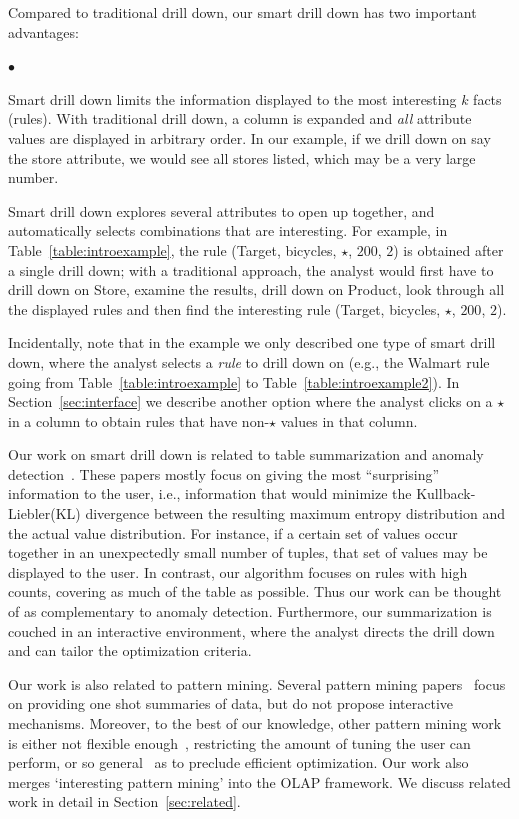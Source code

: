 \documentclass[10pt,journal,compsoc]{IEEEtran}
\newcommand{\squishlist}{
   \begin{list}{$\bullet$}
    { \setlength{\itemsep}{0pt}
      \setlength{\parsep}{2pt}
      \setlength{\topsep}{2pt}
      \setlength{\partopsep}{0pt}
    }
}
\newcommand{\squishend}{\end{list}}
\begin{document}
 Compared to traditional drill down, our smart drill down has two important advantages:
\squishlist
\item
Smart drill down limits the information displayed
to the most interesting $k$ facts (rules).
With traditional drill down, a column is expanded and {\em all}
attribute values are displayed in arbitrary order.
In our example, if we drill down on say the store attribute,
we would see all stores listed, which may be a very large number.
\item
Smart drill down explores several attributes to open up together,
and automatically selects combinations that are interesting.
For example, in Table~\ref{table:introexample},
the rule (Target, bicycles, $\star$, $200$, $2$)
is obtained after a single drill down;
with a traditional approach, the analyst would first have to drill down on
Store, examine the results, drill down on Product,
look through all the displayed rules and then find the interesting rule
(Target, bicycles, $\star$, $200$, $2$).
\squishend

Incidentally, note that in the example we only described one type of smart drill down,
where the analyst selects a {\em rule} to drill down on
(e.g., the Walmart rule going from Table~\ref{table:introexample} to
Table~\ref{table:introexample2}).
In Section~\ref{sec:interface} we describe another option
where the analyst clicks on a $\star$ in a column to obtain
rules that have non-$\star$ values in that column.

Our work on smart drill down is related
to table summarization and anomaly
detection~\cite{Sarawagi:2001:UMA:767141.767148,
Sarawagi00user-adaptiveexploration,
Sarawagi98discovery-drivenexploration,
DBLP:journals/pvldb/GebalyAGKS14}.
These papers mostly focus on
giving the most ``surprising'' information to the user, i.e., information
that would minimize the Kullback-Liebler(KL) divergence between the
resulting maximum entropy distribution and the actual value distribution. For instance, if a certain set of
values occur together in an unexpectedly small number of tuples, that
set of values may be displayed to the user. In contrast, our algorithm
focuses on rules with high counts, covering as
much of the table as possible. Thus our work can be thought of as complementary to anomaly detection.
Furthermore, our summarization is couched in
an interactive environment, where the analyst
directs the drill down and can tailor the optimization criteria.

Our work is also related to pattern mining. Several pattern mining papers~\cite{Vreeken:2011:KMI:1969593.1969615,Bringmann:2007:ICDM,Yan:2005:SIP:1081870.1081907} focus on providing one shot summaries of data, but do not propose interactive mechanisms. Moreover, to the best of our knowledge, other pattern mining work is either not flexible enough~\cite{Goethals:2011:MFI:2020408.2020529,Tatti:2014:FRI:2676651.2656261,DeBie:2010:FMI:1816112.1816117}, restricting the amount of tuning the user can perform, or so general~\cite{Leeuwen:2012:DSS:2347179.2347243} as to preclude efficient optimization. Our work also merges `interesting pattern mining' into the OLAP framework. We discuss related work in detail in Section~\ref{sec:related}.
\end{document}
